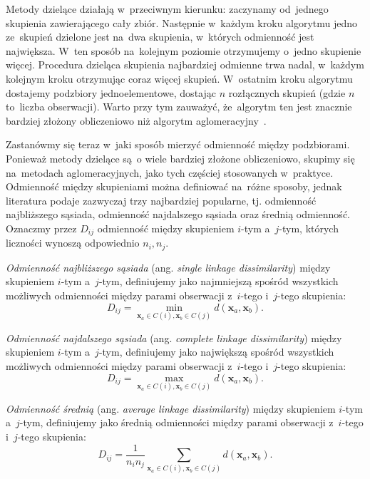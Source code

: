 \documentclass{praca1}
\begin{document}
Metody dzielące działają w~przeciwnym kierunku: zaczynamy od~jednego skupienia zawierającego cały zbiór. Następnie w~każdym kroku algorytmu jedno ze~skupień dzielone jest na~dwa skupienia, w~których odmienność jest największa. W~ten sposób na~kolejnym poziomie otrzymujemy o~jedno skupienie więcej. Procedura dzieląca skupienia najbardziej odmienne trwa nadal, w~każdym kolejnym kroku otrzymując coraz więcej skupień. W~ostatnim kroku algorytmu dostajemy podzbiory jednoelementowe, dostając $n$ rozłącznych skupień (gdzie $n$ to~liczba obserwacji). Warto przy tym zauważyć, że~algorytm ten jest znacznie bardziej złożony obliczeniowo niż algorytm aglomeracyjny~\cite{Hastie2009:elements, Koronacki2005:statystyczne}.

Zastanówmy się teraz w~jaki sposób mierzyć odmienność między podzbiorami. Ponieważ metody dzielące są~o wiele bardziej złożone obliczeniowo, skupimy się na~metodach aglomeracyjnych, jako tych częściej stosowanych w~praktyce. Odmienność między skupieniami można definiować na~różne sposoby, jednak literatura podaje zazwyczaj trzy najbardziej popularne, tj. odmienność najbliższego sąsiada, odmienność najdalszego sąsiada oraz średnią odmienność. Oznaczmy przez $D_{ij}$ odmienność między skupieniem $i$-tym a~$j$-tym, których liczności wynoszą odpowiednio $n_i, n_j$\cite{Hastie2009:elements, Koronacki2005:statystyczne}.

\begin{definition}
\emph{Odmienność najbliższego sąsiada} (ang. \emph{single linkage dissimilarity}) między skupieniem $i$-tym a~$j$-tym, definiujemy jako najmniejszą spośród wszystkich możliwych odmienności między parami obserwacji z~$i$-tego i~$j$-tego skupienia:
$$
D_{ij} = \min\limits_{\mathbf{x}_a \in C(i), \mathbf{x}_b \in C(j)}d(\mathbf{x}_a, \mathbf{x}_b).
$$
\end{definition}

\begin{definition}
\emph{Odmienność najdalszego sąsiada} (ang. \emph{complete linkage dissimilarity}) między skupieniem $i$-tym a~$j$-tym, definiujemy jako największą spośród wszystkich możliwych odmienności między parami obserwacji z~$i$-tego i~$j$-tego skupienia:
$$
D_{ij} = \max\limits_{\mathbf{x}_a \in C(i), \mathbf{x}_b \in C(j)}d(\mathbf{x}_a, \mathbf{x}_b).
$$
\end{definition}

\begin{definition}
\emph{Odmienność średnią} (ang. \emph{average linkage dissimilarity}) między skupieniem $i$-tym a~$j$-tym, definiujemy jako średnią odmienności między parami obserwacji z~$i$-tego i~$j$-tego skupienia:
$$
D_{ij} = \frac{1}{n_i n_j}\sum\limits_{\mathbf{x}_a \in C(i), \mathbf{x}_b \in C(j)}d(\mathbf{x}_a, \mathbf{x}_b).
$$
\end{definition}
\end{document}

